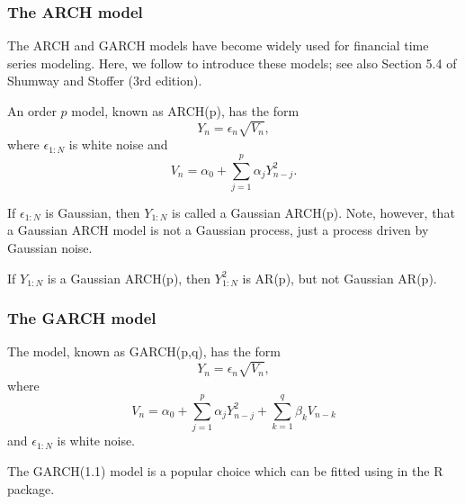 \documentclass{beamer}\usepackage[]{graphicx}\usepackage[]{color}
\begin{document}
\begin{frame}[fragile]

\frametitle{The ARCH model}

\bi

\item The ARCH and GARCH models have become widely used for financial time series modeling. Here, we follow \citet{cowpertwait09} to introduce these models; see also Section 5.4 of Shumway and Stoffer (3rd edition). 

\item An order $p$  model, known as ARCH(p), has the form
$$ Y_n = \epsilon_n \sqrt{V_n},$$
where $\epsilon_{1:N}$ is white noise and
$$ V_n = \alpha_0 + \sum_{j=1}^p \alpha_j Y_{n-j}^2.$$

\item If $\epsilon_{1:N}$ is Gaussian, then $Y_{1:N}$ is called a Gaussian ARCH(p). Note, however, that a Gaussian ARCH model is not a Gaussian process, just a process driven by Gaussian noise.

\item If  $Y_{1:N}$ is a Gaussian ARCH(p), then  $Y_{1:N}^2$ is AR(p), but not Gaussian AR(p).

\ei

\end{frame}

\begin{frame}[fragile]

\frametitle{The GARCH model}

\bi

\item The  model, known as GARCH(p,q), has the form
$$ Y_n = \epsilon_n \sqrt{V_n},$$
where
$$ V_n = \alpha_0 + \sum_{j=1}^p \alpha_j Y_{n-j}^2 + \sum_{k=1}^q \beta_k V_{n-k}$$
and $\epsilon_{1:N}$ is white noise.


\item The GARCH(1.1) model is a popular choice \citep{cowpertwait09} which can be fitted using  in the  R package.

\ei

\end{frame}
\end{document}
